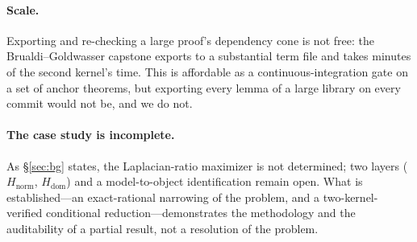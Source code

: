 \paragraph{Scale.} Exporting and re-checking a large proof's dependency cone is not
free: the Brualdi--Goldwasser capstone exports to a substantial term file and takes
minutes of the second kernel's time. This is affordable as a continuous-integration
gate on a set of anchor theorems, but exporting every lemma of a large library on
every commit would not be, and we do not.

\paragraph{The case study is incomplete.} As \S\ref{sec:bg} states, the
Laplacian-ratio maximizer is not determined; two layers ($H_{\mathrm{norm}}$,
$H_{\mathrm{dom}}$) and a model-to-object identification remain open. What is
established---an exact-rational narrowing of the problem, and a two-kernel-verified
conditional reduction---demonstrates the methodology and the auditability of a
partial result, not a resolution of the problem.

